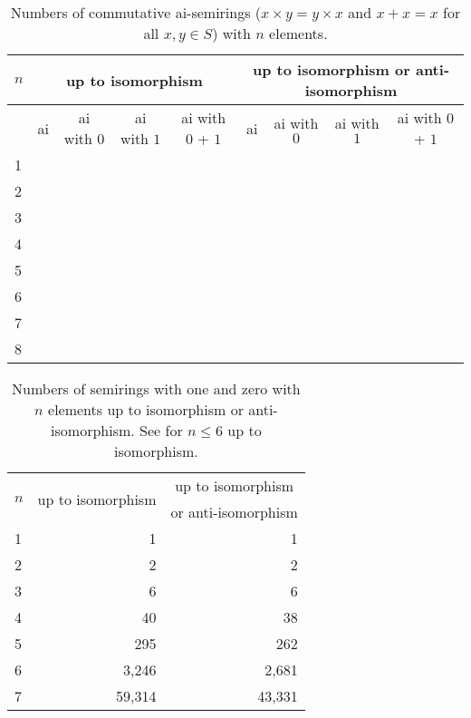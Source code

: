 \documentclass{article}
\theoremstyle{definition}
\theoremstyle{plain}
\begin{document}
\begin{table}[ht]
  \centering
  \begin{tabular}{l|r|r|r|r|r|r|r|r}
    $n$
    & \multicolumn{4}{c|}{up to isomorphism}
    & \multicolumn{4}{c}{up to isomorphism or anti-isomorphism} \\
    \midrule
    & \multicolumn{1}{c|}{ai} & \multicolumn{1}{c|}{ai with $0$}
    & \multicolumn{1}{c|}{ai with $1$} & \multicolumn{1}{c|}{ai with $0$ + $1$}
    & \multicolumn{1}{c|}{ai} & \multicolumn{1}{c}{ai with $0$}
    & \multicolumn{1}{c|}{ai with $1$} & \multicolumn{1}{c|}{ai with $0$ + $1$}
    \\
    \midrule
    1 &              &          &&&          &       \\
    2 &              &          &&&          &       \\
    3 &             &         &&&          &       \\
    4 &            &        &&&         & \\
    5 &         &      &&&        & \\
    6 &        &    &&&      & \\
    7 &      &  &&&     & \\
    8 & & &&&    & \\
  \end{tabular}
  \caption{Numbers of commutative ai-semirings ($x\times y = y \times
    x$ and $x + x = x$ for all $x,y\in S$) with $n$
  elements.}
  \label{tab:ai-semirings}
\end{table}

\begin{table}[ht]
  \centering
  \begin{tabular}{l|r|r}
    \multirow{2}{*}{$n$} & \multicolumn{1}{|c|}{\multirow{2}{*}{up to
    isomorphism}} & \multicolumn{1}{c}{up to isomorphism} \\
    & & \multicolumn{1}{l}{or anti-isomorphism}\\
    \midrule
    1 & 1         & 1      \\
    2 & 2         & 2      \\
    3 & 6         & 6      \\
    4 & 40        & 38     \\
    5 & 295       & 262    \\
    6 & 3,246     & 2,681  \\
    7 & 59,314    & 43,331
  \end{tabular}
  \caption{Numbers of semirings with one and zero with $n$ elements
    up to isomorphism or anti-isomorphism. See \cite{MSsemiringsWithOneAndZero} for \(n\leq6\) up to isomorphism.}
  \label{tab:semirings-with-one-and-zero}
\end{table}
\end{document}
